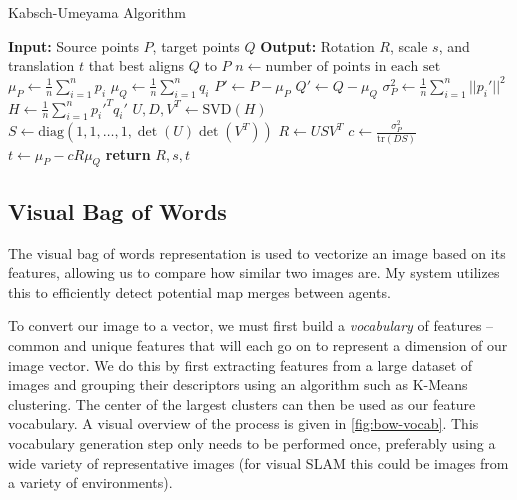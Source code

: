 \begin{algorithm}[H]\small
    \caption{Kabsch-Umeyama Algorithm}
    \label{alg:kabsch-umeyama}
    \begin{algorithmic}[1]
        \State \textbf{Input:} Source points $P$, target points $Q$
        \State \textbf{Output:} Rotation $R$, scale $s$, and translation $t$ that best aligns $Q$ to $P$
        \State $n \gets \text{number of points in each set}$
        \State $\mu_P \gets \frac{1}{n} \sum_{i=1}^n p_i$
        \State $\mu_Q \gets \frac{1}{n} \sum_{i=1}^n q_i$
        \State $P' \gets P - \mu_P$ 
        \State $Q' \gets Q - \mu_Q$ 
        \State $\sigma^2_P \gets \frac{1}{n} \sum_{i=1}^n ||p_i'||^2$ 
        \State $H \gets \frac{1}{n} \sum_{i=1}^n p_i'^T q_i'$ 
        \State $U, D, V^T \gets \text{SVD}(H)$ 
        \State $S \gets \text{diag}(1, 1, \dots, 1, \det(U)\det(V^T))$
        \State $R \gets USV^T$ 
        \State $c \gets \frac{\sigma^2_P}{\text{tr}(DS)}$ 
        \State $t \gets \mu_P - cR\mu_Q$ 
        \State \textbf{return} $R, s, t$
    \end{algorithmic}
\end{algorithm}

\subsection{Visual Bag of Words}
\label{sec:visual-bag-of-words}
The visual bag of words representation is used to vectorize an image based on its features, allowing us to compare how similar two images are. My system utilizes this to efficiently detect potential map merges between agents.

To convert our image to a vector, we must first build a \textit{vocabulary} of features – common and unique features that will each go on to represent a dimension of our image vector. We do this by first extracting features from a large dataset of images and grouping their descriptors using an algorithm such as K-Means clustering. The center of the largest clusters can then be used as our feature vocabulary. A visual overview of the process is given in \autoref{fig:bow-vocab}. This vocabulary generation step only needs to be performed once, preferably using a wide variety of representative images (for visual SLAM this could be images from a variety of environments).


